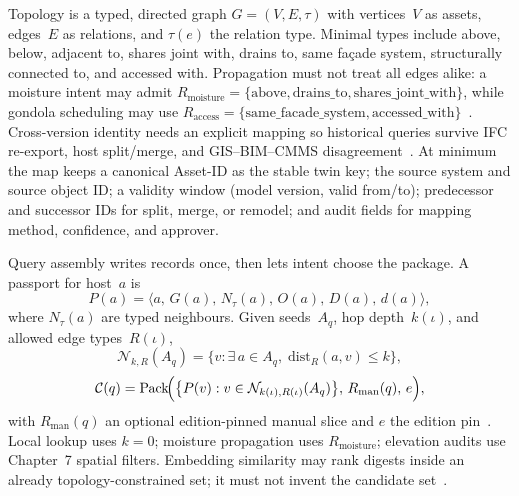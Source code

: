 Topology is a typed, directed graph $G=(V,E,\tau)$ with vertices~$V$ as assets, edges~$E$ as relations, and $\tau(e)$ the relation type. Minimal types include above, below, adjacent to, shares joint with, drains to, same fa\c{c}ade system, structurally connected to, and accessed with. Propagation must not treat all edges alike: a moisture intent may admit
$R_{\mathrm{moisture}}=\{\mathrm{above},\mathrm{drains\_to},\mathrm{shares\_joint\_with}\}$,
while gondola scheduling may use
$R_{\mathrm{access}}=\{\mathrm{same\_facade\_system},\mathrm{accessed\_with}\}$~\cite{peng2024}.
Cross-version identity needs an explicit mapping so historical queries survive IFC re-export, host split/merge, and GIS--BIM--CMMS disagreement~\cite{zhang2025,han2025}. At minimum the map keeps a canonical Asset-ID as the stable twin key; the source system and source object ID; a validity window (model version, valid from/to); predecessor and successor IDs for split, merge, or remodel; and audit fields for mapping method, confidence, and approver.

Query assembly writes records once, then lets intent choose the package. A passport for host~$a$ is
\begin{equation}
\label{eq:ch8-passport}
P(a)=\bigl\langle a,\,G(a),\,N_{\tau}(a),\,O(a),\,D(a),\,d(a)\bigr\rangle,
\end{equation}
where $N_{\tau}(a)$ are typed neighbours. Given seeds~$A_q$, hop depth~$k(\iota)$, and allowed edge types~$R(\iota)$,
\begin{equation}
\label{eq:ch8-khop}
\mathcal{N}_{k,R}(A_q)=\bigl\{v:\exists\,a\in A_q,\;\mathrm{dist}_{R}(a,v)\le k\bigr\},
\end{equation}
\begin{equation}
\label{eq:ch8-package}
\mathcal{C}(q)=\mathrm{Pack}\!\Bigl(\bigl\{P(v):v\in\mathcal{N}_{k(\iota),R(\iota)}(A_q)\bigr\},\,R_{\mathrm{man}}(q),\,e\Bigr),
\end{equation}
with $R_{\mathrm{man}}(q)$ an optional edition-pinned manual slice and $e$ the edition pin~\cite{lewis2020,peng2024,joffe2025buildingcodes}. Local lookup uses $k=0$; moisture propagation uses $R_{\mathrm{moisture}}$; elevation audits use Chapter~7 spatial filters. Embedding similarity may rank digests inside an already topology-constrained set; it must not invent the candidate set~\cite{peng2024,jeon2025hybridrag}.

